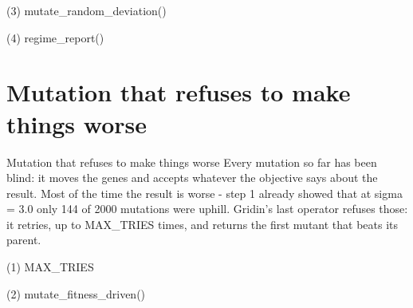 \begin{frame}[fragile]{(3) mutate\_random\_deviation()}

\end{frame}

\begin{frame}[fragile]{(4) regime\_report()}

\end{frame}


\section{Mutation that refuses to make things worse}

\begin{frame}{Mutation that refuses to make things worse}
Every mutation so far has been blind: it moves the genes and accepts whatever
the objective says about the result. Most of the time the result is worse -
step 1 already showed that at sigma = 3.0 only 144 of 2000 mutations were
uphill. Gridin's last operator refuses those: it retries, up to MAX\_TRIES
times, and returns the first mutant that beats its parent.
\end{frame}

\begin{frame}[fragile]{(1) MAX\_TRIES}

\end{frame}

\begin{frame}[fragile]{(2) mutate\_fitness\_driven()}

\end{frame}

